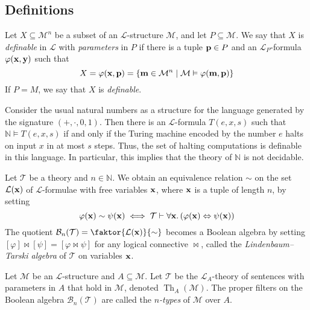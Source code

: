 \subsection{Definitions}
\begin{definition}
    Let \( X \subseteq \mathcal M^n \) be a subset of an \( \mathcal L \)-structure \( \mathcal M \), and let \( P \subseteq \mathcal M \).
    We say that \( X \) is \emph{definable} in \( \mathcal L \) with \emph{parameters} in \( P \) if there is a tuple \( \vb p \in P \) and an \( \mathcal L_P \)-formula \( \varphi(\vb x, \vb y) \) such that
    \[ X = \varphi(\vb x, \vb p) = \qty{\vb m \in \mathcal M^n \mid \mathcal M \vDash \varphi(\vb m, \vb p)} \]
    If \( P = M \), we say that \( X \) is \emph{definable}.
\end{definition}
\begin{example}
    Consider the usual natural numbers as a structure for the language generated by the signature \( (+, \cdot, 0, 1) \).
    Then there is an \( \mathcal L \)-formula \( T(e, x, s) \) such that \( \mathbb N \vDash T(e, x, s) \) if and only if the Turing machine encoded by the number \( e \) halts on input \( x \) in at most \( s \) steps.
    Thus, the set of halting computations is definable in this language.
    In particular, this implies that the theory of \( \mathbb N \) is not decidable.
\end{example}
\begin{definition}
    Let \( \mathcal T \) be a theory and \( n \in \mathbb N \).
    We obtain an equivalence relation \( \sim \) on the set \( \mathcal L(\vb x) \) of \( \mathcal L \)-formulae with free variables \( \vb x \), where \( \vb x \) is a tuple of length \( n \), by setting
    \[ \varphi(\vb x) \sim \psi(\vb x) \iff \mathcal T \vdash \forall \vb x.\, (\varphi(\vb x) \Leftrightarrow \psi(\vb x)) \]
    The quotient \( \mathcal B_n(\mathcal T) = \faktor{\mathcal L(\vb x)}{\sim} \) becomes a Boolean algebra by setting \( [\varphi] \bowtie [\psi] = [\varphi \bowtie \psi] \) for any logical connective \( \bowtie \), called the \emph{Lindenbaum--Tarski algebra} of \( \mathcal T \) on variables \( \vb x \).
\end{definition}
\begin{definition}
    Let \( \mathcal M \) be an \( \mathcal L \)-structure and \( A \subseteq \mathcal M \).
    Let \( \mathcal T \) be the \( \mathcal L_A \)-theory of sentences with parameters in \( A \) that hold in \( \mathcal M \), denoted \( \operatorname{Th}_A(\mathcal M) \).
    The proper filters on the Boolean algebra \( \mathcal B_n(\mathcal T) \) are called the \emph{\( n \)-types} of \( \mathcal M \) over \( A \).
\end{definition}
